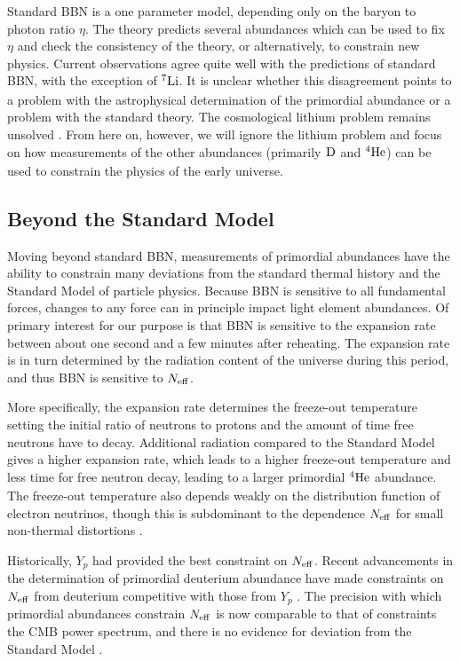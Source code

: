 Standard BBN is a one parameter model, depending only on the baryon to photon ratio $\eta$.  The theory predicts several abundances which can be used to fix $\eta$ and check the consistency of the theory, or alternatively, to constrain new physics.  Current observations agree quite well with the predictions of standard BBN, with the exception of $\nucl{7}{ }{Li}$.  It is unclear whether this disagreement points to a problem with the astrophysical determination of the primordial abundance or a problem with the standard theory.  The cosmological lithium problem remains unsolved \cite{Fields:2011zzb}.  From here on, however, we will ignore the lithium problem and focus on how measurements of the other abundances (primarily $\nucl{ }{ }{D}$ and $\nucl{4}{ }{He}$) can be used to constrain the physics of the early universe.








\subsection{Beyond the Standard Model}\label{BSM}
Moving beyond standard BBN, measurements of primordial abundances have the ability to constrain many deviations from the standard thermal history and the Standard Model of particle physics.  Because BBN is sensitive to all fundamental forces, changes to any force can in principle impact light element abundances.  Of primary interest for our purpose is that BBN is sensitive to the expansion rate between about one second and a few minutes after reheating.  The expansion rate is in turn determined by the radiation content of the universe during this period, and thus BBN is sensitive to $N_{\rm eff}$.  

More specifically, the expansion rate determines the freeze-out temperature setting the initial ratio of neutrons to protons and the amount of time free neutrons have to decay.  Additional radiation compared to the Standard Model gives a higher expansion rate, which leads to a higher freeze-out temperature and less time for free neutron decay, leading to a larger primordial $\nucl{4}{ }{He}$ abundance.  The freeze-out temperature also depends weakly on the distribution function of electron neutrinos, though this is subdominant to the dependence $N_{\rm eff}$ for small non-thermal distortions \cite{Serpico:2004gx}.

Historically, $Y_p$ had provided the best constraint on $N_{\rm eff}$.  Recent advancements in the determination of primordial deuterium abundance have made constraints on $N_{\rm eff}$ from deuterium competitive with those from $Y_p$ \cite{Cooke:2013cba}.  The precision with which primordial abundances constrain $N_{\rm eff}$ is now comparable to that of constraints the CMB power spectrum, and there is no evidence for deviation from the Standard Model \cite{Ade:2015xua}.



